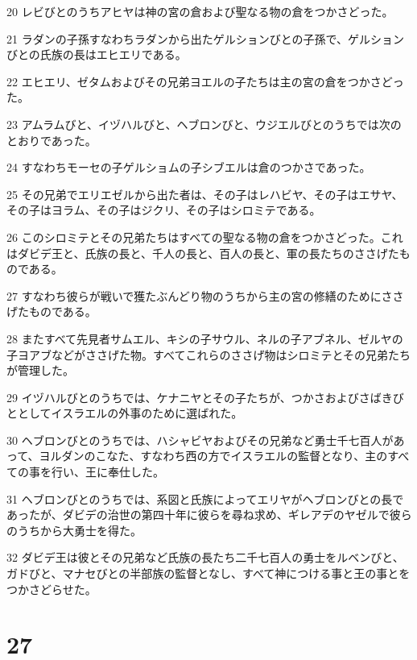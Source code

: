 \par 20 レビびとのうちアヒヤは神の宮の倉および聖なる物の倉をつかさどった。
\par 21 ラダンの子孫すなわちラダンから出たゲルションびとの子孫で、ゲルションびとの氏族の長はエヒエリである。
\par 22 エヒエリ、ゼタムおよびその兄弟ヨエルの子たちは主の宮の倉をつかさどった。
\par 23 アムラムびと、イヅハルびと、ヘブロンびと、ウジエルびとのうちでは次のとおりであった。
\par 24 すなわちモーセの子ゲルショムの子シブエルは倉のつかさであった。
\par 25 その兄弟でエリエゼルから出た者は、その子はレハビヤ、その子はエサヤ、その子はヨラム、その子はジクリ、その子はシロミテである。
\par 26 このシロミテとその兄弟たちはすべての聖なる物の倉をつかさどった。これはダビデ王と、氏族の長と、千人の長と、百人の長と、軍の長たちのささげたものである。
\par 27 すなわち彼らが戦いで獲たぶんどり物のうちから主の宮の修繕のためにささげたものである。
\par 28 またすべて先見者サムエル、キシの子サウル、ネルの子アブネル、ゼルヤの子ヨアブなどがささげた物。すべてこれらのささげ物はシロミテとその兄弟たちが管理した。
\par 29 イヅハルびとのうちでは、ケナニヤとその子たちが、つかさおよびさばきびととしてイスラエルの外事のために選ばれた。
\par 30 ヘブロンびとのうちでは、ハシャビヤおよびその兄弟など勇士千七百人があって、ヨルダンのこなた、すなわち西の方でイスラエルの監督となり、主のすべての事を行い、王に奉仕した。
\par 31 ヘブロンびとのうちでは、系図と氏族によってエリヤがヘブロンびとの長であったが、ダビデの治世の第四十年に彼らを尋ね求め、ギレアデのヤゼルで彼らのうちから大勇士を得た。
\par 32 ダビデ王は彼とその兄弟など氏族の長たち二千七百人の勇士をルベンびと、ガドびと、マナセびとの半部族の監督となし、すべて神につける事と王の事とをつかさどらせた。

\chapter{27}

